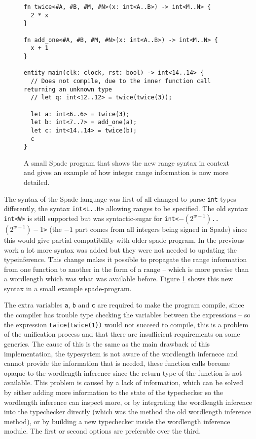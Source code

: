 \begin{figure}[h!]
  \begin{verbatim}
fn twice<#A, #B, #M, #N>(x: int<A..B>) -> int<M..N> {
  2 * x
}

fn add_one<#A, #B, #M, #N>(x: int<A..B>) -> int<M..N> {
  x + 1
}

entity main(clk: clock, rst: bool) -> int<14..14> {
  // Does not compile, due to the inner function call returning an unknown type
  // let q: int<12..12> = twice(twice(3));

  let a: int<6..6> = twice(3);
  let b: int<7..7> = add_one(a);
  let c: int<14..14> = twice(b);
  c
}
  \end{verbatim}
  \caption{A small Spade program that shows the new range syntax in context and gives an example of how integer range information is now more detailed.}
  \label{fig:BetterProgram}
\end{figure}

The syntax of the Spade language was first of all changed to parse \verb+int+ types differently, the syntax \verb+int<L..H>+ allowing ranges to be specified. The old syntax \verb+int<W>+ is still supported but was syntactic-sugar for \verb!int<!$-(2^{w-1})$\verb!..!$(2^{w-1})-1$\verb!>! (the $-1$ part comes from all integers being signed in Spade) since this would give partial compatibility with older spade-program. In the previous work a lot more syntax was added but they were not needed to updating the typeinference. This change makes it possible to propagate the range information from one function to another in the form of a range -- which is more precise than a wordlength which was what was available before. Figure \ref{fig:BetterProgram} shows this new syntax in a small example spade-program.

The extra variables \verb+a+, \verb+b+ and \verb+c+ are required to make the program compile, since the compiler has trouble type checking the variables between the expressions -- so the expression \verb+twice(twice(1))+ would not succeed to compile, this is a problem of the unification process and that there are insufficient requirements on some generics. The cause of this is the same as the main drawback of this implementation, the typesystem is not aware of the wordlength infernece and cannot provide the information that is needed, these function calls become opaque to the wordlength inference since the return type of the function is not available. This problem is caused by a lack of information, which can be solved by either adding more information to the state of the typechecker so the wordlength inference can inspect more, or by integrating the wordlength inference into the typechecker directly (which was the method the old wordlength inference method), or by building a new typechecker inside the wordlength inference module. The first or second options are preferable over the third.

